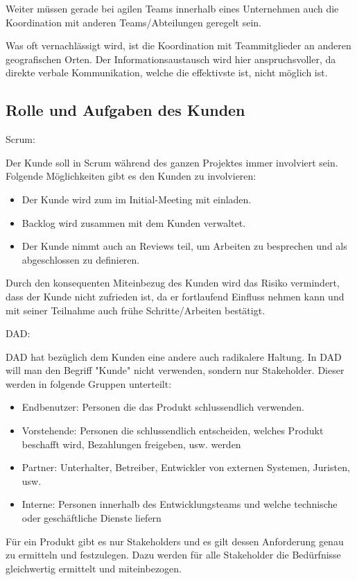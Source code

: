 Weiter müssen gerade bei agilen Teams innerhalb eines Unternehmen auch die Koordination mit anderen Teams/Abteilungen geregelt sein.
\medskip

Was oft vernachlässigt wird, ist die Koordination mit Teammitglieder an anderen geografischen Orten. Der Informationsaustausch wird hier anspruchsvoller, da direkte verbale Kommunikation, welche die effektivste ist, nicht möglich ist.


\subsection{Rolle und Aufgaben des Kunden}

{\Large Scrum:} \cite{planningPrioScrum} \medskip

Der Kunde soll in Scrum während des ganzen Projektes immer involviert sein. Folgende Möglichkeiten gibt es den Kunden zu involvieren:
\begin{itemize}
	\item Der Kunde wird zum im Initial-Meeting mit einladen.
	\item Backlog wird zusammen mit dem Kunden verwaltet.
	\item Der Kunde nimmt auch an Reviews teil, um Arbeiten zu besprechen und als abgeschlossen zu definieren.
\end{itemize}
Durch den konsequenten Miteinbezug des Kunden wird das Risiko vermindert, dass der Kunde nicht zufrieden ist, da er fortlaufend Einfluss nehmen kann und mit seiner Teilnahme auch frühe Schritte/Arbeiten bestätigt.
\bigskip 

{\Large DAD:} \cite{planningPrioDad} \medskip

DAD hat bezüglich dem Kunden eine andere auch radikalere Haltung. In DAD will man den Begriff "Kunde" nicht verwenden, sondern nur Stakeholder. Dieser werden in folgende Gruppen unterteilt:
\begin{itemize}
	\item Endbenutzer: Personen die das Produkt schlussendlich verwenden.
	\item Vorstehende: Personen die schlussendlich entscheiden, welches Produkt beschafft wird, Bezahlungen freigeben, usw. werden
	\item Partner: Unterhalter, Betreiber, Entwickler von externen Systemen, Juristen, usw.
	\item Interne: Personen innerhalb des Entwicklungsteams und welche technische oder geschäftliche Dienste liefern
\end{itemize}
Für ein Produkt gibt es nur Stakeholders und es gilt dessen Anforderung genau zu ermitteln und festzulegen. Dazu werden für alle Stakeholder die Bedürfnisse gleichwertig ermittelt und miteinbezogen. \smallskip

